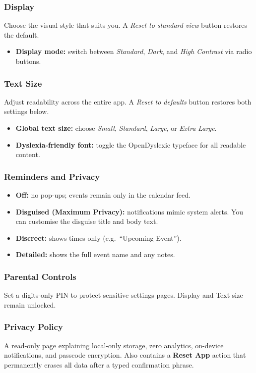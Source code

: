 \documentclass[11pt,a4paper]{article}
\begin{document}
\subsubsection*{Display}
Choose the visual style that suits you. A \emph{Reset to standard view} button
restores the default.
\begin{itemize}
    \item \textbf{Display mode:} switch between \emph{Standard}, \emph{Dark},
          and \emph{High Contrast} via radio buttons.
\end{itemize}
\subsubsection*{Text Size}
Adjust readability across the entire app. A \emph{Reset to defaults} button
restores both settings below.
\begin{itemize}
    \item \textbf{Global text size:} choose \emph{Small}, \emph{Standard},
          \emph{Large}, or \emph{Extra Large}.
    \item \textbf{Dyslexia-friendly font:} toggle the OpenDyslexic typeface for
          all readable content.
\end{itemize}
\subsubsection*{Reminders and Privacy}
\begin{itemize}
    \item \textbf{Off:} no pop-ups; events remain only in the calendar feed.
    \item \textbf{Disguised (Maximum Privacy):} notifications mimic system
          alerts. You can customise the disguise title and body text.
    \item \textbf{Discreet:} shows times only (e.g.\ ``Upcoming Event'').
    \item \textbf{Detailed:} shows the full event name and any notes.
\end{itemize}
\subsubsection*{Parental Controls}
Set a digits-only PIN to protect sensitive settings pages. Display and Text size
remain unlocked.
\subsubsection*{Privacy Policy}
A read-only page explaining local-only storage, zero analytics, on-device
notifications, and passcode encryption. Also contains a \textbf{Reset App}
action that permanently erases all data after a typed confirmation phrase.
\end{document}

